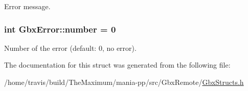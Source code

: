 Error message. 

\hypertarget{structGbxError_ae5627cae63e837beaa75f798e47be50e}{
\subsubsection[{number}]{\setlength{\rightskip}{0pt plus 5cm}int Gbx\-Error\-::number = 0}}\label{structGbxError_ae5627cae63e837beaa75f798e47be50e}


Number of the error (default\-: 0, no error). 



The documentation for this struct was generated from the following file\-:\begin{DoxyCompactItemize}
\item 
/home/travis/build/\-The\-Maximum/mania-\/pp/src/\-Gbx\-Remote/\hyperlink{GbxStructs_8h}{Gbx\-Structs.\-h}\end{DoxyCompactItemize}
